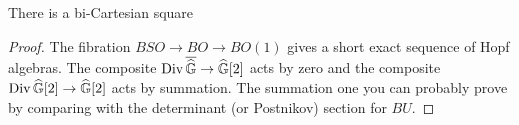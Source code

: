 \begin{corollary}
There is a bi-Cartesian square
\begin{center}
\end{center}
\end{corollary}
\begin{proof}
The fibration $BSO \to BO \to BO(1)$ gives a short exact sequence of Hopf algebras.  The composite $\operatorname{Div} \overline{\widehat{\mathbb G}} \to \widehat{\mathbb G}[2]$ acts by zero and the composite $\operatorname{Div} \widehat{\mathbb G}[2] \to \widehat{\mathbb G}[2]$ acts by summation.  The summation one you can probably prove by comparing with the determinant (or Postnikov) section for $BU$.
\end{proof}

